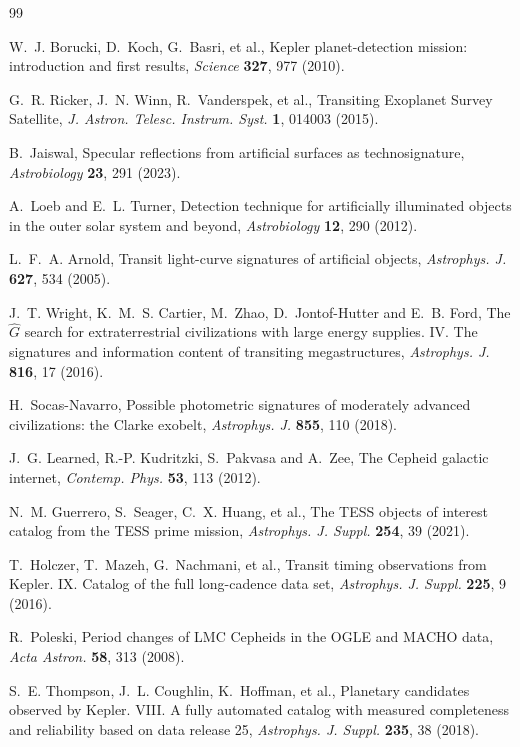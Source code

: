 \documentclass[3p,11pt]{elsarticle}
\begin{document}
\begin{thebibliography}{99}\small\raggedright
\setlength{\itemsep}{1pt}

W.~J. Borucki, D.~Koch, G.~Basri, et al., Kepler planet-detection mission: introduction
and first results, \emph{Science} \textbf{327}, 977 (2010).

G.~R. Ricker, J.~N. Winn, R.~Vanderspek, et al., Transiting Exoplanet Survey Satellite,
\emph{J. Astron. Telesc. Instrum. Syst.} \textbf{1}, 014003 (2015).

B.~Jaiswal, Specular reflections from artificial surfaces as technosignature,
\emph{Astrobiology} \textbf{23}, 291 (2023).

A.~Loeb and E.~L. Turner, Detection technique for artificially illuminated objects in
the outer solar system and beyond, \emph{Astrobiology} \textbf{12}, 290 (2012).

L.~F.~A. Arnold, Transit light-curve signatures of artificial objects, \emph{Astrophys.
J.} \textbf{627}, 534 (2005).

J.~T. Wright, K.~M.~S. Cartier, M.~Zhao, D.~Jontof-Hutter and E.~B. Ford, The $\hat{G}$
search for extraterrestrial civilizations with large energy supplies. IV. The
signatures and information content of transiting megastructures, \emph{Astrophys. J.}
\textbf{816}, 17 (2016).

H.~Socas-Navarro, Possible photometric signatures of moderately advanced civilizations:
the Clarke exobelt, \emph{Astrophys. J.} \textbf{855}, 110 (2018).

J.~G. Learned, R.-P. Kudritzki, S.~Pakvasa and A.~Zee, The Cepheid galactic internet,
\emph{Contemp. Phys.} \textbf{53}, 113 (2012).

N.~M. Guerrero, S.~Seager, C.~X. Huang, et al., The TESS objects of interest catalog
from the TESS prime mission, \emph{Astrophys. J. Suppl.} \textbf{254}, 39 (2021).

T.~Holczer, T.~Mazeh, G.~Nachmani, et al., Transit timing observations from Kepler. IX.
Catalog of the full long-cadence data set, \emph{Astrophys. J. Suppl.} \textbf{225}, 9
(2016).

R.~Poleski, Period changes of LMC Cepheids in the OGLE and MACHO data, \emph{Acta
Astron.} \textbf{58}, 313 (2008).

S.~E. Thompson, J.~L. Coughlin, K.~Hoffman, et al., Planetary candidates observed by
Kepler. VIII. A fully automated catalog with measured completeness and reliability
based on data release 25, \emph{Astrophys. J. Suppl.} \textbf{235}, 38 (2018).


\end{thebibliography}
\end{document}
